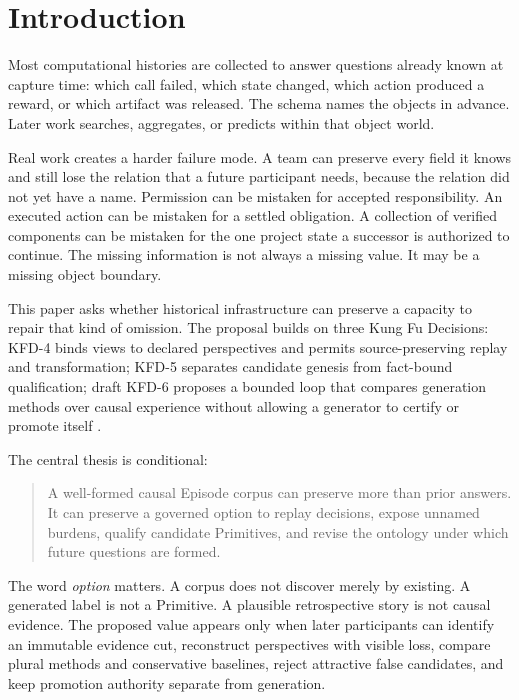 \section{Introduction}
\label{sec:introduction}

Most computational histories are collected to answer questions already known
at capture time: which call failed, which state changed, which action produced
a reward, or which artifact was released. The schema names the objects in
advance. Later work searches, aggregates, or predicts within that object world.

Real work creates a harder failure mode. A team can preserve every field it
knows and still lose the relation that a future participant needs, because the
relation did not yet have a name. Permission can be mistaken for accepted
responsibility. An executed action can be mistaken for a settled obligation.
A collection of verified components can be mistaken for the one project state
a successor is authorized to continue. The missing information is not always a
missing value. It may be a missing object boundary.

This paper asks whether historical infrastructure can preserve a capacity to
repair that kind of omission. The proposal builds on three Kung Fu Decisions:
KFD-4 binds views to declared perspectives and permits source-preserving replay
and transformation; KFD-5 separates candidate genesis from fact-bound
qualification; draft KFD-6 proposes a bounded loop that compares generation
methods over causal experience without allowing a generator to certify or
promote itself \cite{kfd4Decision2026,kfd5Decision2026,kfd6Decision2026}.

The central thesis is conditional:

\begin{quote}
A well-formed causal Episode corpus can preserve more than prior answers. It
can preserve a governed option to replay decisions, expose unnamed burdens,
qualify candidate Primitives, and revise the ontology under which future
questions are formed.
\end{quote}

The word \emph{option} matters. A corpus does not discover merely by existing.
A generated label is not a Primitive. A plausible retrospective story is not
causal evidence. The proposed value appears only when later participants can
identify an immutable evidence cut, reconstruct perspectives with visible
loss, compare plural methods and conservative baselines, reject attractive
false candidates, and keep promotion authority separate from generation.

